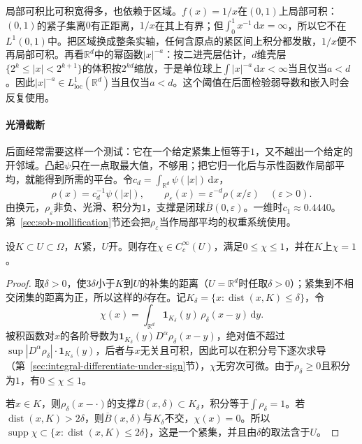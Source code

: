 局部可积比可积宽得多，也依赖于区域。$f(x)=1/x$在$(0,1)$上局部可积：$(0,1)$的紧子集离$0$有正距离，$1/x$在其上有界；但$\int_0^1 x^{-1}\,\mathrm dx=\infty$，所以它不在$L^1(0,1)$中。把区域换成整条实轴，任何含原点的紧区间上积分都发散，$1/x$便不再局部可积。再看$\mathbb R^d$中的幂函数$|x|^{-a}$：按二进壳层估计，$d$维壳层$\{2^k\le|x|<2^{k+1}\}$的体积按$2^{kd}$缩放，于是单位球上$\int|x|^{-a}\,\mathrm dx<\infty$当且仅当$a<d$。因此$|x|^{-a}\in L^1_{\mathrm{loc}}(\mathbb R^d)$当且仅当$a<d$。这个阈值在后面检验弱导数和嵌入时会反复使用。

\paragraph{光滑截断}
后面经常需要这样一个测试：它在一个给定紧集上恒等于$1$，又不越出一个给定的开邻域。凸起$\psi$只在一点取最大值，不够用；把它归一化后与示性函数作局部平均，就能得到所需的平台。令$c_d=\int_{\mathbb R^d}\psi(|x|)\,\mathrm dx$，
\begin{equation}
 \rho(x)=c_d^{-1}\psi(|x|),\qquad \rho_\varepsilon(x)=\varepsilon^{-d}\rho(x/\varepsilon)\quad(\varepsilon>0).
 \label{eq:sob-mollifier}
\end{equation}
由换元，$\rho_\varepsilon$非负、光滑、积分为$1$，支撑是闭球$\overline{B}(0,\varepsilon)$。一维时$c_1\approx0.4440$。第~\ref{sec:sob-mollification}节还会把$\rho_\varepsilon$当作局部平均的权重系统使用。

\begin{lemma}[光滑截断]
\label{lem:sob-cutoff}
设$K\subset U\subset\Omega$，$K$紧，$U$开。则存在$\chi\in C_c^\infty(U)$，满足$0\le\chi\le1$，并在$K$上$\chi=1$。
\end{lemma}

\begin{proof}
取$\delta>0$，使$3\delta$小于$K$到$U$的补集的距离（$U=\mathbb R^d$时任取$\delta>0$）；紧集到不相交闭集的距离为正，所以这样的$\delta$存在。记$K_\delta=\{x:\operatorname{dist}(x,K)\le\delta\}$，令
\[
 \chi(x)=\int_{\mathbb R^d}\mathbf 1_{K_\delta}(y)\,\rho_\delta(x-y)\,\mathrm dy .
\]
被积函数对$x$的各阶导数为$\mathbf 1_{K_\delta}(y)D^\alpha\rho_\delta(x-y)$，绝对值不超过$\sup|D^\alpha\rho_\delta|\cdot\mathbf 1_{K_\delta}(y)$，后者与$x$无关且可积，因此可以在积分号下逐次求导（第~\ref{sec:integral-differentiate-under-sign}节），$\chi$无穷次可微。由于$\rho_\delta\ge0$且积分为$1$，有$0\le\chi\le1$。

若$x\in K$，则$\rho_\delta(x-\cdot)$的支撑$\overline B(x,\delta)\subset K_\delta$，积分等于$\int\rho_\delta=1$。若$\operatorname{dist}(x,K)>2\delta$，则$\overline B(x,\delta)$与$K_\delta$不交，$\chi(x)=0$。所以$\operatorname{supp}\chi\subset\{x:\operatorname{dist}(x,K)\le2\delta\}$，这是一个紧集，并且由$\delta$的取法含于$U$。
\end{proof}

